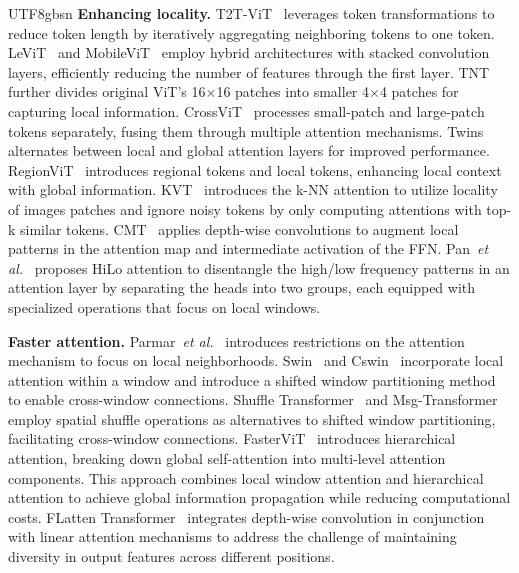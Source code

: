 \documentclass[10pt,journal,compsoc]{IEEEtran}
\newcommand{\etal}{\emph{et al.}}
\newcommand{\<}{\left\langle}
\renewcommand{\>}{\right\rangle}
\newcommand{\1}{\mathbbm{1}}
\begin{document}
\begin{CJK}{UTF8}{gbsn}
\noindent\textbf{Enhancing locality.}
T2T-ViT~\cite{yuan2021tokens} leverages token transformations to reduce token length by iteratively aggregating neighboring tokens to one token. 
LeViT~\cite{graham2021levit} and MobileViT~\cite{mehta2021mobilevit} employ hybrid architectures with stacked convolution layers, efficiently reducing the number of features through the first layer.
TNT~\cite{han2021Transformer} further divides original ViT's 16$\times$16 patches into smaller 4$\times$4 patches for capturing local information.
CrossViT~\cite{chen2021crossvit} processes small-patch and large-patch tokens separately, fusing them through multiple attention mechanisms.
Twins~\cite{chu2021twins} alternates between local and global attention layers for improved performance.
RegionViT~\cite{chen2021regionvit} introduces regional tokens and local tokens, enhancing local context with global information.
KVT~\cite{wang2022kvt} introduces the k-NN attention to utilize locality of images patches and ignore noisy tokens by only computing attentions with top-k similar tokens.
CMT~\cite{guo2022cmt} applies depth-wise convolutions to augment local patterns in the attention map and intermediate activation of the FFN.
Pan~\etal~\cite{pan2022fast} proposes HiLo attention to disentangle the high/low frequency patterns in an attention layer by separating the heads into two groups, each equipped with specialized operations that focus on local windows.

\noindent\textbf{Faster attention.}
Parmar~\etal~\cite{parmar2018image} introduces restrictions on the attention mechanism to focus on local neighborhoods. Swin~\cite{liu2021swin} and Cswin~\cite{dong2022cswin} incorporate local attention within a window and introduce a shifted window partitioning method to enable cross-window connections. Shuffle Transformer~\cite{huang2021shuffle} and Msg-Transformer~\cite{fang2022msg} employ spatial shuffle operations as alternatives to shifted window partitioning, facilitating cross-window connections. FasterViT~\cite{hatamizadeh2023fastervit} introduces hierarchical attention, breaking down global self-attention into multi-level attention components. This approach combines local window attention and hierarchical attention to achieve global information propagation while reducing computational costs.
FLatten Transformer~\cite{han2023flatten} integrates depth-wise convolution in conjunction with linear attention mechanisms to address the challenge of maintaining diversity in output features across different positions. 


\end{CJK}
\end{document}
